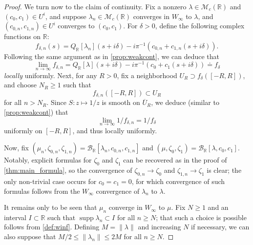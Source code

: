 \documentclass{cams-l} %
\newcommand{\RR}{\mathbb R}
\newcommand{\cM}{\mathcal M}
\newcommand{\cB}{\mathcal B}
\newcommand{\ovl}[1]{{\overline{#1}}}
\newcommand{\supp}{\operatorname{supp}}
\theoremstyle{definition}
\theoremstyle{remark}
\numberwithin{equation}{section}
\begin{document}
\begin{proof}
    We turn now to the claim of continuity. Fix a nonzero $\lambda\in\cM_c(\RR)$ and $(c_0,c_1)\in U^i$, and suppose $\lambda_n\in\cM_c(\RR)$ converges in $W_\infty$ to $\lambda$, and $(c_{0,n},c_{1,n})\in U^i$ converges to $(c_0,c_1)$. For $\delta>0$, define the following complex functions on $\RR$:
    \[f_{\delta,n}(s) = Q_\RR[\lambda_n](s+i\delta) - i\pi^{-1}\left(c_{0,n}+c_{1,n}(s + i\delta)\right).\]
    Following the same argument as in \cref{prop:weakcont}, we can deduce that
    \[\lim_{n\to\infty} f_{\delta,n} = Q_\RR[\lambda](s+i\delta) - i\pi^{-1}\left(c_{0}+c_{1}(s + i\delta)\right) \doteq f_\delta\]
    \emph{locally} uniformly. Next, for any $R>0$, fix a neighborhood $U_R\supset f_\delta([-R,R])$, and choose $N_R\geq 1$ such that
    \[f_{\delta,n}([-R,R])\subset U_R\]
    for all $n>N_R$. Since $S:z\mapsto 1/z$ is smooth on $\ovl{U}_R$, we deduce (similar to \cref{prop:weakcont}) that
    \[\lim_{n\to\infty} 1/f_{\delta,n} = 1/f_\delta\]
    uniformly on $[-R,R]$, and thus locally uniformly.

    Now, fix $(\mu_n,\zeta_{0,n},\zeta_{1,n}) = \cB_\RR[\lambda_n,c_{0,n},c_{1,n}]$ and $(\mu,\zeta_0,\zeta_1)=\cB_\RR[\lambda,c_0,c_1]$. Notably, explicit formulas for $\zeta_0$ and $\zeta_1$ can be recovered as in the proof of \cref{thm:main_formula}, so the convergence of $\zeta_{0,n}\to\zeta_0$ and $\zeta_{1,n}\to\zeta_1$ is clear; the only non-trivial case occurs for $c_0=c_1=0$, for which convergence of such formulas follows from the $W_\infty$ convergence of $\lambda_n$ to $\lambda$. 
    
    It remains only to be seen that $\mu_n$ converge in $W_\infty$ to $\mu$. Fix $N\geq 1$ and an interval $I\subset\RR$ such that $\supp\lambda_n\subset I$ for all $n\geq N$; that such a choice is possible follows from \cref{def:winf}. Defining $M = \|\lambda\|$ and increasing $N$ if necessary, we can also suppose that $M/2\leq \|\lambda_n\|\leq 2M$ for all $n\geq N$. 


\end{proof}
\end{document}
